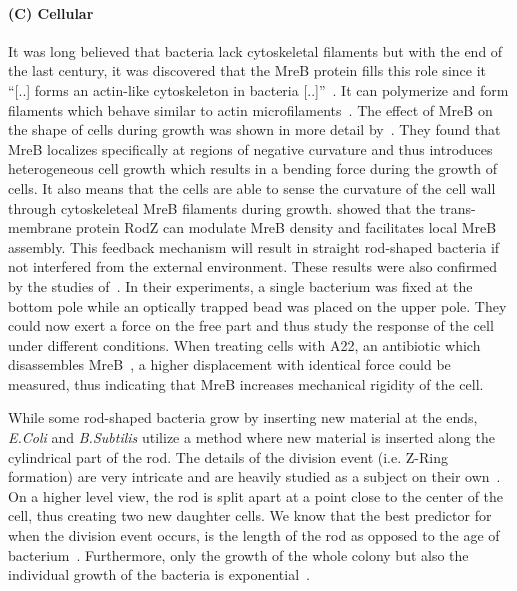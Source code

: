 \documentclass{article}
\begin{document}
\paragraph{(C) Cellular}
It was long believed that bacteria lack cytoskeletal filaments but with the end of the last century,
it was discovered that the MreB protein fills this role since it “[..] forms an actin-like
cytoskeleton in bacteria [..]”~\cite{Erickson2001}.
It can polymerize and form filaments which behave similar to actin microfilaments~\cite{Dersch2020}.
The effect of MreB on the shape of cells during growth was shown in more detail
by~\cite{Ursell2014}.
They found that MreB localizes specifically at regions of negative curvature and thus introduces
heterogeneous cell growth which results in a bending force during the growth of cells.
It also means that the cells are able to sense the curvature of the cell wall through cytoskeleteal
MreB filaments during growth.
\cite{Bratton2018} showed that the trans-membrane protein RodZ can modulate MreB density and
facilitates local MreB assembly.
This feedback mechanism will result in straight rod-shaped bacteria if not interfered from the
external environment.
These results were also confirmed by the studies of~\cite{Wang2010}.
In their experiments, a single bacterium was fixed at the bottom pole while an optically trapped
bead was placed on the upper pole.
They could now exert a force on the free part and thus study the response of the cell under
different conditions.
When treating cells with A22, an antibiotic which disassembles
MreB~\cite{IWAI2002,Gitai2005,Karczmarek2007,Bean2009}, a higher displacement with identical force
could be measured, thus indicating that MreB increases mechanical rigidity of the cell.

While some rod-shaped bacteria grow by inserting new material at the ends, \textit{E.Coli} and
\textit{B.Subtilis} utilize a method where new material is inserted along the cylindrical part of
the rod.
The details of the division event (i.e. Z-Ring formation) are very intricate and are heavily
studied as a subject on their own~\cite{Harry2001}.
On a higher level view, the rod is split apart at a point close to the center of the cell, thus
creating two new daughter cells.
We know that the best predictor for when the division event occurs, is the length of the rod as
opposed to the age of bacterium~\cite{Robert2014}.
Furthermore, only the growth of the whole colony but also the individual growth of the bacteria is
exponential~\cite{Amir2014,Takeuchi2005}.
\end{document}

